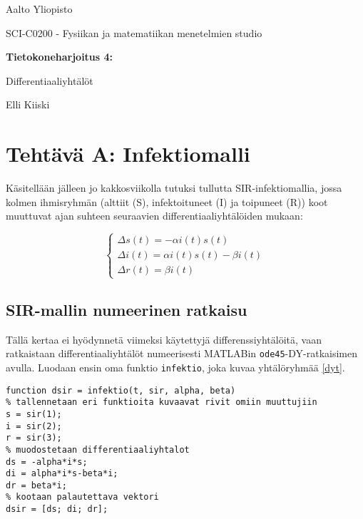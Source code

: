 \documentclass[a4paper,11pt]{article}
\begin{document}
{
\thispagestyle{empty}

{\large
Aalto Yliopisto
\par
SCI-C0200 - Fysiikan ja matematiikan menetelmien studio
}

\vspace{7cm}

{\huge \bf
Tietokoneharjoitus 4: 
\par
Differentiaaliyhtälöt}

\vspace{2cm}

{\Large Elli Kiiski}

\vfill
}

\clearpage

\tableofcontents

\clearpage

\section{Tehtävä A: Infektiomalli}

Käsitellään jälleen jo kakkosviikolla tutuksi tullutta SIR-infektiomallia, jossa kolmen ihmisryhmän (alttiit (S), infektoituneet (I) ja toipuneet (R)) koot muuttuvat ajan suhteen seuraavien differentiaaliyhtälöiden mukaan:

\begin{equation}
\label{dyt}
\begin{cases}
\Delta s(t) = -\alpha i(t) s(t) \\
\Delta i(t) = \alpha i(t) s(t) - \beta i(t) \\
\Delta r(t) = \beta i(t)
\end{cases}
\end{equation}

\subsection{SIR-mallin numeerinen ratkaisu}

Tällä kertaa ei hyödynnetä viimeksi käytettyjä differenssiyhtälöitä, vaan ratkaistaan differentiaaliyhtälöt numeerisesti MATLABin \texttt{ode45}-DY-ratkaisimen avulla. Luodaan ensin oma funktio \texttt{infektio}, joka kuvaa yhtälöryhmää \ref{dyt}.

\begin{lstlisting}
function dsir = infektio(t, sir, alpha, beta)
% tallennetaan eri funktioita kuvaavat rivit omiin muuttujiin
s = sir(1);
i = sir(2);
r = sir(3);
% muodostetaan differentiaaliyhtalot
ds = -alpha*i*s;
di = alpha*i*s-beta*i;
dr = beta*i;
% kootaan palautettava vektori
dsir = [ds; di; dr];
\end{lstlisting}
\end{document}
